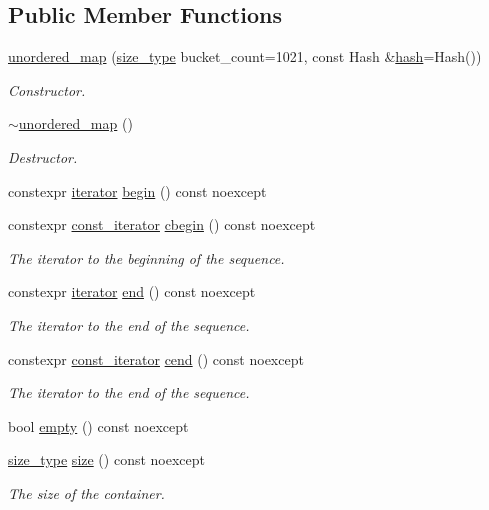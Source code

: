 \subsection*{Public Member Functions}
\begin{DoxyCompactItemize}
\item 
\hyperlink{classshad_1_1unordered__map_acd64334034dd1af3a1cc39f3b62fc622}{unordered\-\_\-map} (\hyperlink{group__Types_ga2a84980e6d435a8a7b1a99f78b828a65}{size\-\_\-type} bucket\-\_\-count=1021, const Hash \&\hyperlink{structshad_1_1hash}{hash}=Hash())
\begin{DoxyCompactList}\small\item\em Constructor. \end{DoxyCompactList}\item 
\hyperlink{classshad_1_1unordered__map_a3964d9033e56109fbbcabdf565c2d8a9}{$\sim$unordered\-\_\-map} ()
\begin{DoxyCompactList}\small\item\em Destructor. \end{DoxyCompactList}\item 
constexpr \hyperlink{group__Types_gab52d604c26835c20a0363f9affa7ff57}{iterator} \hyperlink{group__Iterators_ga3753eddf67b531a3718ae7eb1e33b131}{begin} () const noexcept
\item 
constexpr \hyperlink{group__Types_ga102c3cd521767bf4b22f3788ccc054e8}{const\-\_\-iterator} \hyperlink{group__Iterators_gaf264a3126cd78a96da927c0f17890fca}{cbegin} () const noexcept
\begin{DoxyCompactList}\small\item\em The iterator to the beginning of the sequence. \end{DoxyCompactList}\item 
constexpr \hyperlink{group__Types_gab52d604c26835c20a0363f9affa7ff57}{iterator} \hyperlink{group__Iterators_ga5a1c3f388ffec559f61de7e2eb17eaa2}{end} () const noexcept
\begin{DoxyCompactList}\small\item\em The iterator to the end of the sequence. \end{DoxyCompactList}\item 
constexpr \hyperlink{group__Types_ga102c3cd521767bf4b22f3788ccc054e8}{const\-\_\-iterator} \hyperlink{group__Iterators_ga563bf6f0949e2ed31c86fc2b22f26df1}{cend} () const noexcept
\begin{DoxyCompactList}\small\item\em The iterator to the end of the sequence. \end{DoxyCompactList}\item 
bool \hyperlink{group__Capacity_gade6abbe1bedf25b8c2fb53eab2420e71}{empty} () const noexcept
\item 
\hyperlink{group__Types_ga2a84980e6d435a8a7b1a99f78b828a65}{size\-\_\-type} \hyperlink{group__Capacity_ga0d8b21fa4842806604fa7a5f82d6f637}{size} () const noexcept
\begin{DoxyCompactList}\small\item\em The size of the container. \end{DoxyCompactList}\end{DoxyCompactItemize}
